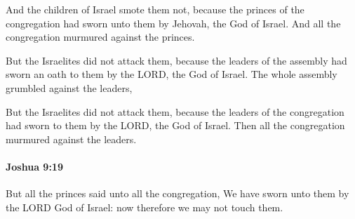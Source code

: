			\begin{versebox}
					\item[BHS] 
					\item[ASV] And the children of Israel smote them not, because the princes of the congregation had sworn unto them by Jehovah, the God of Israel. And all the congregation murmured against the princes.
					\item[NIV] But the Israelites did not attack them, because the leaders of the assembly had sworn an oath to them by the LORD, the God of Israel. The whole assembly grumbled against the leaders,
					\item[NRSV] But the Israelites did not attack them, because the leaders of the congregation had sworn to them by the LORD, the God of Israel. Then all the congregation murmured against the leaders.
			\end{versebox}

		\paragraph{Joshua 9:19} %
			\label{JOSHUA-9-19}

			But all the princes said unto all the congregation, We have sworn unto them by the LORD God of Israel: now therefore we may not touch them.

